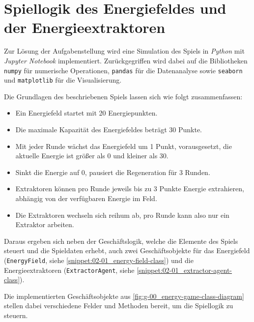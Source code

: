 \section{Spiellogik des Energiefeldes und der Energieextraktoren}
\label{sec:02-01_game-logic-of-energy-field-and-energy-extractors}

Zur Lösung der Aufgabenstellung wird eine Simulation des Spiels in \textit{Python} mit \textit{Jupyter Notebook} implementiert. Zurückgegriffen wird dabei auf die Bibliotheken \texttt{numpy} für numerische Operationen, \texttt{pandas} für die Datenanalyse sowie \texttt{seaborn} und \texttt{matplotlib} für die Visualisierung.

Die Grundlagen des beschriebenen Spiels lassen sich wie folgt zusammenfassen:

\begin{itemize}
    \item Ein Energiefeld startet mit 20 Energiepunkten.
    \item Die maximale Kapazität des Energiefeldes beträgt 30 Punkte.
    \item Mit jeder Runde wächst das Energiefeld um 1 Punkt, vorausgesetzt, die aktuelle Energie ist größer als 0 und kleiner als 30.
    \item Sinkt die Energie auf 0, pausiert die Regeneration für 3 Runden.
    \item Extraktoren können pro Runde jeweils bis zu 3 Punkte Energie extrahieren, abhängig von der verfügbaren Energie im Feld.
    \item Die Extraktoren wechseln sich reihum ab, pro Runde kann also nur ein Extraktor arbeiten.
\end{itemize}

Daraus ergeben sich neben der Geschäftslogik, welche die Elemente des Spiels steuert und die Spieldaten erhebt, auch zwei Geschäftsobjekte für das Energiefeld (\texttt{EnergyField}, siehe \autoref{snippet:02-01_energy-field-class}) und die Energieextraktoren (\texttt{ExtractorAgent}, siehe \autoref{snippet:02-01_extractor-agent-class}).


Die implementierten Geschäftsobjekte aus \autoref{fig:g-00_energy-game-class-diagram} stellen dabei verschiedene Felder und Methoden bereit, um die Spiellogik zu steuern.

